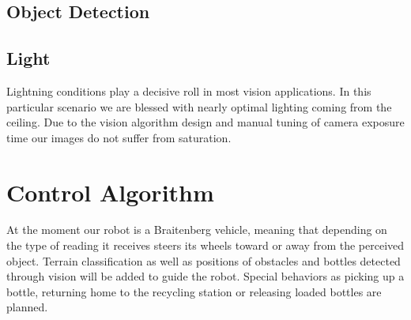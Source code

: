 \subsection{Object Detection}

\subsection{Light}
Lightning conditions play a decisive roll in most vision applications. In this
particular scenario we are blessed with nearly optimal lighting coming from the
ceiling. Due to the vision algorithm design and manual tuning of camera exposure time
our images do not suffer from saturation.

\section{Control Algorithm}
At the moment our robot is a Braitenberg vehicle, meaning that depending on the type
of reading it receives steers its wheels toward or away from the perceived object. 
Terrain classification as well as positions of obstacles and bottles detected through 
vision will be added to guide the robot. Special behaviors as picking up a bottle, 
returning home to the recycling station or releasing loaded bottles are planned.
